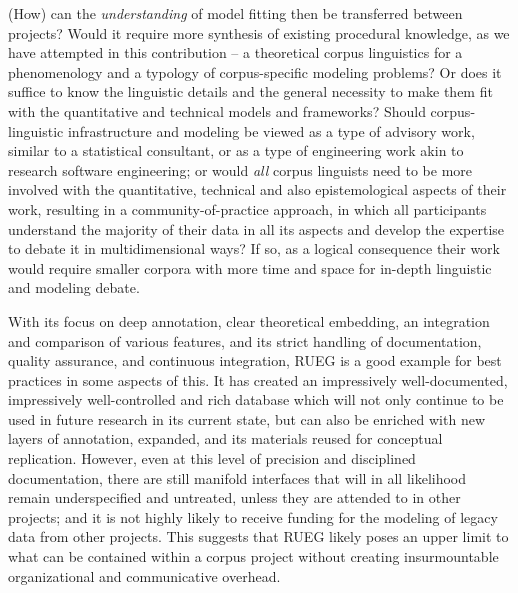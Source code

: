 \documentclass[output=paper,colorlinks,citecolor=brown]{langscibook}
\begin{document}
(How) can the \textit{understanding} of model fitting then be transferred between projects? Would it require more synthesis of existing procedural knowledge, as we have attempted in this contribution -- a theoretical corpus linguistics for a phenomenology and a typology of corpus-specific modeling problems? Or does it suffice to know the linguistic details and the general necessity to make them fit with the quantitative and technical models and frameworks? Should corpus-linguistic infrastructure and modeling be viewed as a type of advisory work, similar to a statistical consultant, or as a type of engineering work akin to research software engineering; or would \textit{all} corpus linguists need to be more involved with the quantitative, technical and also epistemological aspects of their work, resulting in a community-of-practice approach, in which all participants understand the majority of their data in all its aspects and develop the expertise to debate it in multidimensional ways? If so, as a logical consequence their work would require smaller corpora with more time and space for in-depth linguistic and modeling debate. 

With its focus on deep annotation, clear theoretical embedding, an integration and comparison of various features, and its strict handling of documentation, quality assurance, and continuous integration, RUEG is a good example for best practices in some aspects of this. It has created an impressively well-documented, impressively well-controlled and rich database which will not only continue to be used in future research in its current state, but can also be enriched with new layers of annotation, expanded, and its materials reused for conceptual replication. However, even at this level of precision and disciplined documentation, there are still manifold interfaces that will in all likelihood remain underspecified and untreated, unless they are attended to in other projects; and it is not highly likely to receive funding for the modeling of legacy data from other projects. This suggests that RUEG likely poses an upper limit to what can be contained within a corpus project without creating insurmountable organizational and communicative overhead. 
\end{document}

